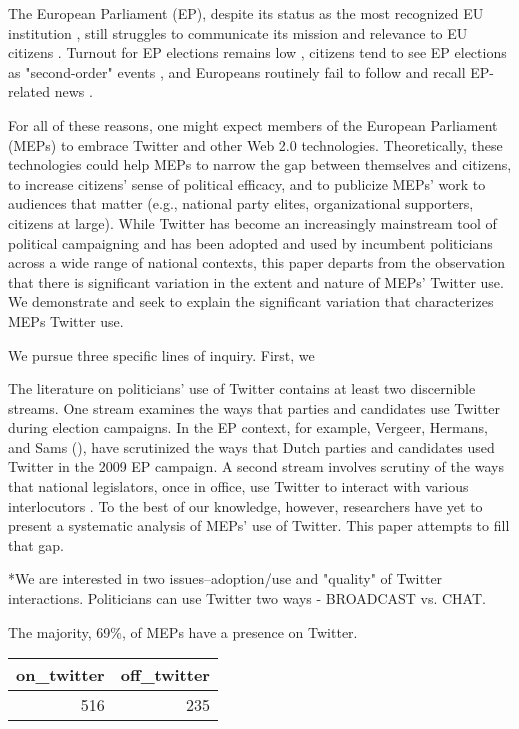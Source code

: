 \documentclass{article}\usepackage[]{graphicx}\usepackage[]{color}
\begin{document}
The European Parliament (EP), despite its status as the most recognized EU institution \cite[e.g.,]{eurobarometer.2014}, still struggles to communicate its mission and relevance to EU citizens \citep*{anderson.mcleod.2004}. Turnout for EP elections remains low \citep*{hobolt.2014, franklin.hobolt.2011, mattila.2013}, citizens tend to see EP elections as "second-order" events \citep*{hix.marsh.2007, schmitt.2005}, and Europeans routinely fail to follow and recall EP-related news \citep*{eurobarometer.2013}. 

For all of these reasons, one might expect members of the European Parliament (MEPs) to embrace Twitter and other Web 2.0 technologies. Theoretically, these technologies could help MEPs to narrow the gap between themselves and citizens, to increase citizens' sense of political efficacy, and to publicize MEPs' work to audiences that matter (e.g., national party elites, organizational supporters, citizens at large). While Twitter has become an increasingly mainstream tool of political campaigning and has been adopted and used by incumbent politicians across a wide range of national contexts, this paper departs from the observation that there is significant variation in the extent and nature of MEPs' Twitter use. We demonstrate and seek to explain the significant variation that characterizes MEPs Twitter use.

We pursue three specific lines of inquiry. First, we  

The literature on politicians' use of Twitter contains at least two discernible streams. One stream examines the ways that parties and candidates use Twitter during election campaigns. In the EP context, for example, Vergeer, Hermans, and Sams (\citeyear{vergeer.hermans.sams.2011,vergeer.hermans.sams.2013}), have scrutinized the ways that Dutch parties and candidates used Twitter in the 2009 EP campaign. A second stream involves scrutiny of the ways that national legislators, once in office, use Twitter to interact with various interlocutors \citep*{ausserhofer.maireder.2013, chi.yang.2010, glass man.strauss.shogan.2013, larsson.kalsnes.2014, peterson.2012, shogun.2010, williams.gulati.2010}. To the best of our knowledge, however, researchers have yet to present a systematic analysis of MEPs' use of Twitter. This paper attempts to fill that gap.

*We are interested in two issues--adoption/use and "quality" of Twitter interactions. Politicians can use Twitter two ways - BROADCAST vs. CHAT.

The majority, 69\%, of MEPs have a presence on Twitter. 
\begin{table}[ht]
\centering
\begin{tabular}{rr}
  \hline
on\_twitter & off\_twitter \\ 
  \hline
516 & 235 \\ 
   \hline
\end{tabular}
\end{table}
\end{document}
